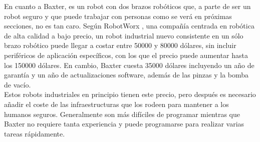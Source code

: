 \noindent En cuanto a Baxter, es un robot con dos brazos robóticos que, a parte de ser un robot seguro \cite{reardon2015towards} y que puede trabajar con personas como se verá en próximas secciones, no es tan caro. Según RobotWorx \cite{robots}, una compañía centrada en robótica de alta calidad a bajo precio, un robot industrial nuevo consistente en un sólo brazo robótico puede llegar a costar entre 50000 y 80000 dólares, sin incluir periféricos de aplicación específicos, con los que el precio puede aumentar hasta los 150000 dólares. En cambio, Baxter cuesta 35000 dólares incluyendo un año de garantía y un año de actualizaciones software, además de las pinzas y la bomba de vacío. \\

\noindent Estos robots industriales en principio tienen este precio, pero después es necesario añadir el coste de las infraestructuras que los rodeen para mantener a los humanos seguros. Generalmente son más difíciles de programar mientras que Baxter no requiere tanta experiencia y puede programarse para realizar varias tareas rápidamente. 


